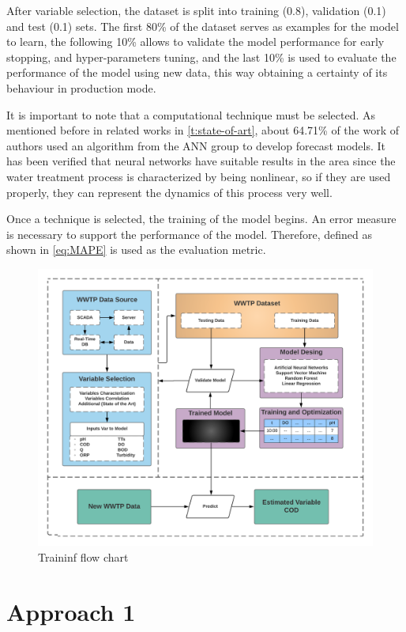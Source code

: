 After variable selection, the dataset is split into training (0.8), validation (0.1) and test (0.1) sets. The first 80\% of the dataset serves as examples for the model to learn, the following 10\% allows to validate the model performance for early stopping, and hyper-parameters tuning, and the last 10\% is used to evaluate the performance of the model using new data, this way obtaining a certainty of its behaviour in production mode. 

It is important to note that a computational technique must be selected. As mentioned before in related works in \autoref{t:state-of-art}, about 64.71\% of the work of authors used an algorithm from the ANN group to develop forecast models. It has been verified that neural networks have suitable results in the area since the water treatment process is characterized by being nonlinear, so if they are used properly, they can represent the dynamics of this process very well. 

Once a technique is selected, the training of the model begins. An error measure is necessary to support the performance of the model. Therefore, defined as shown in \autoref{eq:MAPE} is used as the evaluation metric.

\begin{figure}[h]
\centering
\includegraphics[width=\linewidth]{figures/Ch4/training-FlowChart.png}
\caption{Traininf flow chart}
\label{f:training-flowchart}
\end{figure}

\section{Approach 1}
\label{s:Approach1}

